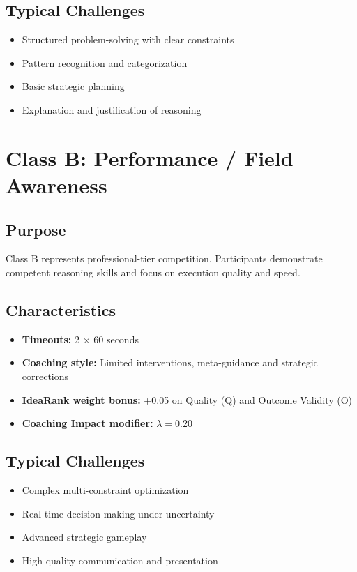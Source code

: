 \subsection{Typical Challenges}
\begin{itemize}[leftmargin=*]
  \item Structured problem-solving with clear constraints
  \item Pattern recognition and categorization
  \item Basic strategic planning
  \item Explanation and justification of reasoning
\end{itemize}

\section{Class B: Performance / Field Awareness}

\subsection{Purpose}
Class B represents professional-tier competition. Participants demonstrate competent reasoning skills and focus on execution quality and speed.

\subsection{Characteristics}
\begin{itemize}[leftmargin=*]
  \item \textbf{Timeouts:} 2 $\times$ 60 seconds
  \item \textbf{Coaching style:} Limited interventions, meta-guidance and strategic corrections
  \item \textbf{IdeaRank weight bonus:} +0.05 on Quality (Q) and Outcome Validity (O)
  \item \textbf{Coaching Impact modifier:} $\lambda = 0.20$
\end{itemize}

\subsection{Typical Challenges}
\begin{itemize}[leftmargin=*]
  \item Complex multi-constraint optimization
  \item Real-time decision-making under uncertainty
  \item Advanced strategic gameplay
  \item High-quality communication and presentation
\end{itemize}

